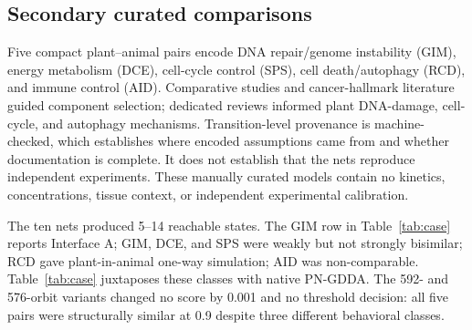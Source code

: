 \documentclass{ws-jbcb}
\numberwithin{equation}{section}
\begin{document}
\subsection{Secondary curated comparisons}\label{sec:case-method}

Five compact plant--animal pairs encode DNA repair/genome instability (GIM), energy
metabolism (DCE), cell-cycle control (SPS), cell death/autophagy (RCD), and
immune control (AID). Comparative studies and cancer-hallmark literature guided
component selection; dedicated reviews informed plant DNA-damage, cell-cycle,
and autophagy mechanisms.\cite{Quimbaya2012,ClavijoBuritica2023,Hanahan2022,
Yoshiyama2013} Transition-level provenance is machine-checked, which establishes
where encoded assumptions came from and whether documentation is complete. It
does not establish that the nets reproduce independent experiments. These
manually curated models contain no kinetics, concentrations, tissue context, or
independent experimental calibration.

The ten nets produced 5--14 reachable states. The GIM row in
Table~\ref{tab:case} reports Interface A; GIM, DCE, and SPS were weakly but
not strongly bisimilar; RCD gave plant-in-animal one-way simulation; AID was
non-comparable. Table~\ref{tab:case} juxtaposes these classes with native
PN-GDDA. The 592- and 576-orbit variants changed no score by 0.001 and no
threshold decision: all five pairs were structurally similar at 0.9 despite
three different behavioral classes.

\begin{table}[t]
\end{table}
\end{document}
